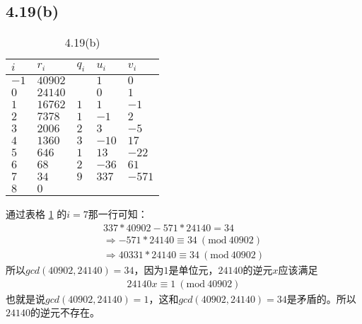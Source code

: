 \documentclass[acmlarge,screen]{acmart}
\begin{document}
\subsection{4.19(b)}
\begin{table}
  \caption{4.19(b)}
  \label{tab:4.19(b)}
  \begin{tabular}{m{5em} m{5em} m{5em} m{5em} m{5em}}
    \toprule
    $i$&$r_i$&$q_i$&$u_i$&$v_i$\\
    \midrule
    $-1$&$40902$&&$1$&$0$\\
    $0$&$24140$&&$0$&$1$\\
	$1$&$16762$&$1$&$1$&$-1$\\
	$2$&$7378$&$1$&$-1$&$2$\\
	$3$&$2006$&$2$&$3$&$-5$\\
	$4$&$1360$&$3$&$-10$&$17$\\
	$5$&$646$&$1$&$13$&$-22$\\
	$6$&$68$&$2$&$-36$&$61$\\
	$7$&$34$&$9$&$337$&$-571$\\
	$8$&$0$&&&\\
  \bottomrule
\end{tabular}
\end{table}
通过表格 \ref{tab:4.19(b)} 的$i=7$那一行可知：
\begin{align*}
	337*40902-571*24140=34\\
	\Rightarrow-571*24140\equiv34\ (\text{mod}\ 40902)\\
	\Rightarrow40331*24140\equiv34\ (\text{mod}\ 40902)
\end{align*}
所以$gcd(40902, 24140)=34$，因为$1$是单位元，$24140$的逆元$x$应该满足
\begin{align*}
24140x\equiv1\ (\text{mod}\ 40902)	
\end{align*}
也就是说$gcd(40902, 24140)=1$，这和$gcd(40902, 24140)=34$是矛盾的。所以$24140$的逆元不存在。
\end{document}
